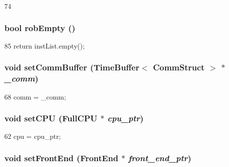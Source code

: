 \begin{DoxyCode}
74 { }
\end{DoxyCode}
\hypertarget{classInorderBackEnd_a5c38df1621043861ada4dd0939509869}{
\subsubsection[{robEmpty}]{\setlength{\rightskip}{0pt plus 5cm}bool robEmpty ()}}
\label{classInorderBackEnd_a5c38df1621043861ada4dd0939509869}



\begin{DoxyCode}
85 { return instList.empty(); }
\end{DoxyCode}
\hypertarget{classInorderBackEnd_aeabdb9f0aae07df67c3029f8fddb2693}{
\subsubsection[{setCommBuffer}]{\setlength{\rightskip}{0pt plus 5cm}void setCommBuffer ({\bf TimeBuffer}$<$ {\bf CommStruct} $>$ $\ast$ {\em \_\-comm})}}
\label{classInorderBackEnd_aeabdb9f0aae07df67c3029f8fddb2693}



\begin{DoxyCode}
68     { comm = _comm; }
\end{DoxyCode}
\hypertarget{classInorderBackEnd_ad491c9766121fc19aa77fd0723e7641d}{
\subsubsection[{setCPU}]{\setlength{\rightskip}{0pt plus 5cm}void setCPU ({\bf FullCPU} $\ast$ {\em cpu\_\-ptr})}}
\label{classInorderBackEnd_ad491c9766121fc19aa77fd0723e7641d}



\begin{DoxyCode}
62     { cpu = cpu_ptr; }
\end{DoxyCode}
\hypertarget{classInorderBackEnd_a122009fa2730cee3898ac945227da8eb}{
\subsubsection[{setFrontEnd}]{\setlength{\rightskip}{0pt plus 5cm}void setFrontEnd ({\bf FrontEnd} $\ast$ {\em front\_\-end\_\-ptr})}}
\label{classInorderBackEnd_a122009fa2730cee3898ac945227da8eb}



